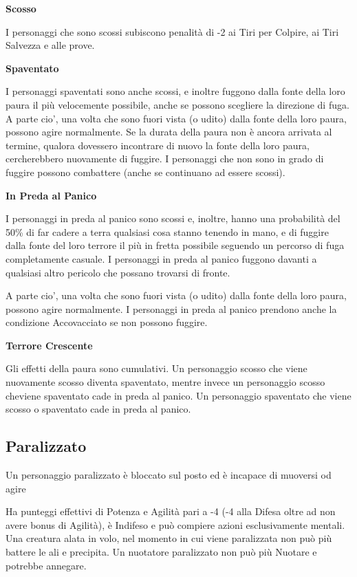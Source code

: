 \documentclass[a4paper,11pt,twoside,openany]{book}
\begin{document}
\textbf{Scosso}

I personaggi che sono scossi subiscono penalità di -2 ai Tiri per Colpire, ai Tiri Salvezza e alle prove.

\textbf{Spaventato}

I personaggi spaventati sono anche scossi, e inoltre fuggono dalla fonte della loro paura il più velocemente possibile, anche se possono scegliere la direzione di fuga. A parte cio', una volta che sono fuori vista (o udito) dalla fonte della loro paura, possono agire normalmente. Se la durata della paura non è ancora arrivata al termine, qualora dovessero incontrare di nuovo la fonte della loro paura, cercherebbero nuovamente di fuggire. I personaggi che non sono in grado di fuggire possono combattere (anche se continuano ad essere scossi).

\textbf{In Preda al Panico}

I personaggi in preda al panico sono scossi e, inoltre, hanno una probabilità del 50\% di far cadere a terra qualsiasi cosa stanno tenendo in mano, e di fuggire dalla fonte del loro terrore il più in fretta possibile seguendo un percorso di fuga completamente casuale. I personaggi in preda al panico fuggono davanti a qualsiasi altro pericolo che possano trovarsi di fronte.

A parte cio', una volta che sono fuori vista (o udito) dalla fonte della loro paura, possono agire normalmente. I personaggi in preda al panico prendono anche la condizione Accovacciato se non possono fuggire.

\textbf{Terrore Crescente}

Gli effetti della paura sono cumulativi. Un personaggio scosso che viene nuovamente scosso diventa spaventato, mentre invece un personaggio scosso cheviene spaventato cade in preda al panico. Un personaggio spaventato che viene scosso o spaventato cade in preda al panico.


\subsection{Paralizzato}

\label{paralizzato}

Un personaggio paralizzato è bloccato sul posto ed è incapace di muoversi od agire

Ha punteggi effettivi di Potenza e Agilità pari a -4 (-4 alla Difesa oltre ad non avere bonus di Agilità), è Indifeso e può compiere azioni esclusivamente mentali. Una creatura alata in volo, nel momento in cui viene paralizzata non può più battere le ali e precipita. Un nuotatore paralizzato non può più Nuotare e potrebbe annegare.
\end{document}
